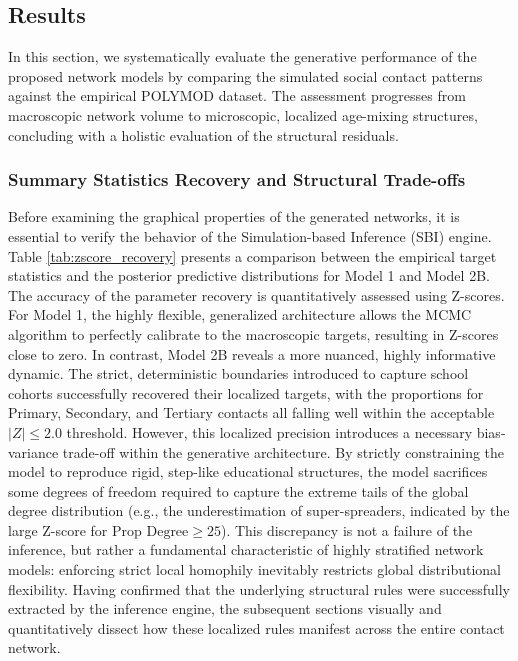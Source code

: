 \subsection{Results}
\label{sec:results}

In this section, we systematically evaluate the generative performance of the proposed network models by comparing the simulated social contact patterns against the empirical POLYMOD dataset.
The assessment progresses from macroscopic network volume to microscopic, localized age-mixing structures, concluding with a holistic evaluation of the structural residuals.

\subsubsection{Summary Statistics Recovery and Structural Trade-offs}

Before examining the graphical properties of the generated networks, it is essential to verify the behavior of the Simulation-based Inference (SBI) engine.
Table \ref{tab:zscore_recovery} presents a comparison between the empirical target statistics and the posterior predictive distributions for Model 1 and Model 2B.
The accuracy of the parameter recovery is quantitatively assessed using Z-scores.
For Model 1, the highly flexible, generalized architecture allows the MCMC algorithm to perfectly calibrate to the macroscopic targets, resulting in Z-scores close to zero.
In contrast, Model 2B reveals a more nuanced, highly informative dynamic.
The strict, deterministic boundaries introduced to capture school cohorts successfully recovered their localized targets, with the proportions for Primary, Secondary, and Tertiary contacts all falling well within the acceptable $|Z| \le 2.0$ threshold.
However, this localized precision introduces a necessary bias-variance trade-off within the generative architecture.
By strictly constraining the model to reproduce rigid, step-like educational structures, the model sacrifices some degrees of freedom required to capture the extreme tails of the global degree distribution (e.g., the underestimation of super-spreaders, indicated by the large Z-score for $\text{Prop Degree} \ge 25$).
This discrepancy is not a failure of the inference, but rather a fundamental characteristic of highly stratified network models: enforcing strict local homophily inevitably restricts global distributional flexibility.
Having confirmed that the underlying structural rules were successfully extracted by the inference engine, the subsequent sections visually and quantitatively dissect how these localized rules manifest across the entire contact network.

